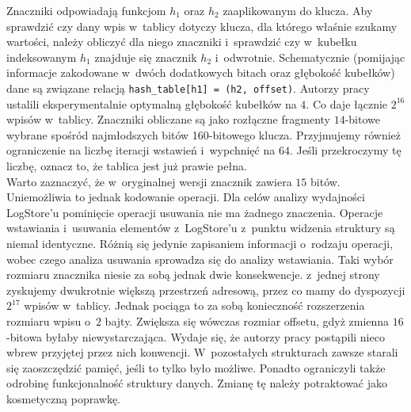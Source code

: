 \documentclass[declaration,shortabstract,masc]{iithesis}
\begin{document}
			\indent Znaczniki odpowiadają funkcjom $h_1$ oraz $h_2$ zaaplikowanym do klucza. Aby sprawdzić czy dany wpis w~tablicy dotyczy klucza, dla którego właśnie szukamy wartości, należy obliczyć dla niego znaczniki i~sprawdzić czy w~kubełku indeksowanym $h_1$ znajduje się znacznik $h_2$ i~odwrotnie. Schematycznie (pomijając informacje zakodowane w~dwóch dodatkowych bitach oraz głębokość kubełków) dane są związane relacją \texttt{hash\_table[h1] = (h2, offset)}. Autorzy pracy \cite{SILT} ustalili eksperymentalnie optymalną głębokość kubełków na $4$. Co daje łącznie $2^{16}$ wpisów w~tablicy. Znaczniki obliczane są jako rozłączne fragmenty $14$-bitowe wybrane spośród najmłodszych bitów 160-bitowego klucza. Przyjmujemy również ograniczenie na liczbę iteracji wstawień i~wypchnięć na $64$. Jeśli przekroczymy tę liczbę, oznacz to, że tablica jest już prawie pełna.\\
			\indent Warto zaznaczyć, że w~oryginalnej wersji znacznik zawiera $15$ bitów. Uniemożliwia to jednak kodowanie operacji. Dla celów analizy wydajności LogStore'u pominięcie operacji usuwania nie ma żadnego znaczenia. Operacje wstawiania i~usuwania elementów z~LogStore'u z~punktu widzenia struktury są niemal identyczne. Różnią się jedynie zapisaniem informacji o~rodzaju operacji, wobec czego analiza usuwania sprowadza się do analizy wstawiania. Taki wybór rozmiaru znacznika niesie za sobą jednak dwie konsekwencje. z~jednej strony zyskujemy dwukrotnie większą przestrzeń adresową, przez co mamy do dyspozycji $2^{17}$ wpisów w~tablicy. Jednak pociąga to za sobą konieczność rozszerzenia rozmiaru wpisu o~$2$ bajty. Zwiększa się wówczas rozmiar offsetu, gdyż zmienna $16$-bitowa byłaby niewystarczająca. Wydaje się, że autorzy pracy postąpili nieco wbrew przyjętej przez nich konwencji. W~pozostałych strukturach zawsze starali się zaoszczędzić pamięć, jeśli to tylko było możliwe. Ponadto ograniczyli także odrobinę funkcjonalność struktury danych. Zmianę tę należy potraktować jako kosmetyczną poprawkę.\\
\end{document}
